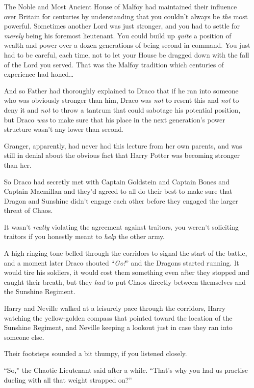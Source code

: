 The Noble and Most Ancient House of Malfoy had maintained their influence over Britain for centuries by understanding that you couldn’t always be \emph{the} most powerful. Sometimes another Lord was just stronger, and you had to settle for \emph{merely} being his foremost lieutenant. You could build up \emph{quite} a position of wealth and power over a dozen generations of being second in command. You just had to be careful, each time, not to let your House be dragged down with the fall of the Lord you served. That was the Malfoy tradition which centuries of experience had honed…

And so Father had thoroughly explained to Draco that if he ran into someone who was obviously stronger than him, Draco was \emph{not} to resent this and \emph{not} to deny it and \emph{not} to throw a tantrum that could sabotage his potential position, but Draco \emph{was} to make sure that his place in the next generation’s power structure wasn’t any lower than second.

Granger, apparently, had never had this lecture from her own parents, and was still in denial about the obvious fact that Harry Potter was becoming stronger than her.

So Draco had secretly met with Captain Goldstein and Captain Bones and Captain Macmillan and they’d agreed to all do their best to make sure that Dragon and Sunshine didn’t engage each other before they engaged the larger threat of Chaos.

It wasn’t \emph{really} violating the agreement against traitors, you weren’t soliciting traitors if you honestly meant to \emph{help} the other army.

A high ringing tone belled through the corridors to signal the start of the battle, and a moment later Draco shouted “\emph{Go!}” and the Dragons started running. It would tire his soldiers, it would cost them something even after they stopped and caught their breath, but they \emph{had} to put Chaos directly between themselves and the Sunshine Regiment.

\later

Harry and Neville walked at a leisurely pace through the corridors, Harry watching the yellow-golden compass that pointed toward the location of the Sunshine Regiment, and Neville keeping a lookout just in case they ran into someone else.

Their footsteps sounded a bit thumpy, if you listened closely.

“So,” the Chaotic Lieutenant said after a while. “That’s why you had us practise dueling with all that weight strapped on?”

